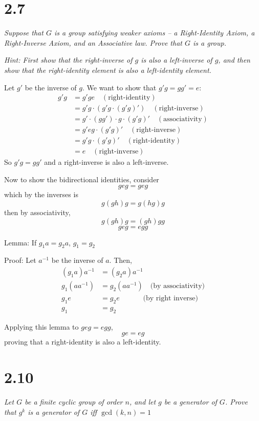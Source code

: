\documentclass[12pt]{article}
\begin{document}
\section*{2.7}
\emph{Suppose that $G$ is a group satisfying weaker axioms -- a Right-Identity Axiom, a Right-Inverse Axiom, and an Associative law. Prove that $G$ is a group.}

\emph{Hint: First show that the right-inverse of $g$ is also a left-inverse of $g$, and then show that the right-identity element is also a left-identity element.}

\color{blue}
Let $g'$ be the inverse of $g$. We want to show that $g'g = gg' = e$:
\begin{align*}
    g'g &= g'ge \quad (\text{right-identity})\\
    &= g'g \cdot (g'g \cdot (g'g)') \quad (\text{right-inverse})\\
    &= g'\cdot (g g') \cdot g \cdot (g'g)' \quad (\text{associativity})\\
    &= g'eg \cdot (g'g)' \quad (\text{right-inverse})\\
    &= g'g \cdot (g'g)' \quad (\text{right-identity})\\
    &= e \quad (\text{right-inverse})
\end{align*}
So $g'g = gg'$ and a right-inverse is also a left-inverse.

Now to show the bidirectional identities, consider
\[geg = geg\]
which by the inverses is 
\[g(gh)g=g(hg)g\]
then by associativity,
\[g(gh)g = (gh)gg\]
\[geg = egg\]

Lemma: If $g_1a= g_2a$, $g_1 = g_2$ 

Proof: Let $a^{-1}$ be the inverse of $a$. Then, 
\begin{align*}
    (g_1a)a^{-1} &=(g_2a)a^{-1}\\
    g_1(aa^{-1}) &= g_2(aa^{-1}) \quad \text{(by associativity)}\\
    g_1e &= g_2 e \qquad\quad\; \text{(by right inverse)}\\
    g_1 &= g_2
\end{align*}

Applying this lemma to $geg = egg$, 
\[ge = eg\]
proving that a right-identity is also a left-identity. 
\color{black}
\pagebreak

\section*{2.10}
\emph{Let $G$ be a finite cyclic group of order $n$, and let $g$ be a generator of $G$. Prove that $g^k$ is a generator of $G$ iff $\gcd(k, n) = 1$}
\end{document}
